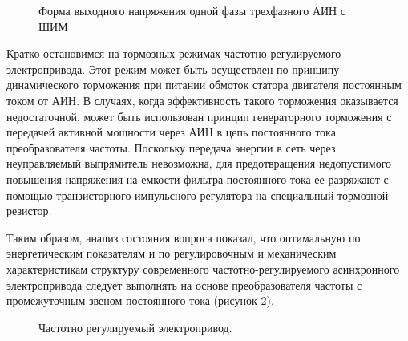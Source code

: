         \begin{figure}[h!]
            \caption{Форма выходного напряжения одной фазы трехфазного АИН с ШИМ}
            \label{fig:3ph-pwm}
        \end{figure}

        Кратко остановимся на тормозных режимах частотно-регулируемого
        электропривода. Этот режим может быть осуществлен по принципу
        динамического торможения при питании обмоток статора двигателя
        постоянным током от АИН. В случаях, когда эффективность такого
        торможения оказывается недостаточной, может быть использован принцип
        генераторного торможения с передачей активной мощности через АИН в цепь
        постоянного тока преобразователя частоты. Поскольку передача энергии в
        сеть через неуправляемый выпрямитель невозможна, для предотвращения
        недопустимого повышения напряжения на емкости фильтра постоянного тока
        ее разряжают с помощью транзисторного импульсного регулятора на
        специальный тормозной резистор. 

        Таким образом, анализ состояния вопроса показал, что оптимальную по
        энергетическим показателям и по регулировочным и механическим
        характеристикам структуру современного частотно-регулируемого
        асинхронного электропривода следует выполнять на основе преобразователя
        частоты с промежуточным звеном постоянного тока (рисунок
        \ref{fig:ain}).

        \begin{figure}[h!]
            \caption{Частотно регулируемый электропривод.}
            \label{fig:ain}
        \end{figure}
        
